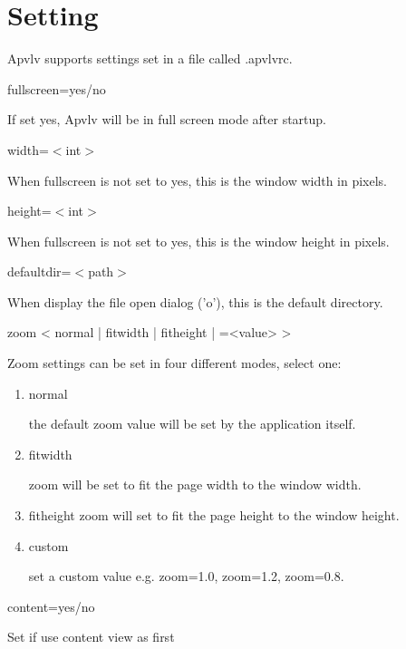 \documentclass[a4paper,12pt]{article}
\newcommand{\apvlv}{\textsf{Apvlv{ }}}
\begin{document}
\newpage

\section{Setting}\label{setting}

\apvlv supports settings set in a file called .apvlvrc.

\begin{description}

\item fullscreen=yes/no

If set yes, \apvlv will be in full screen mode after startup.

\item width=$<$int$>$

When fullscreen is not set to yes, this is the window width in pixels.

\item height=$<$int$>$

When fullscreen is not set to yes, this is the window height in pixels.

\item defaultdir=$<$path$>$

When display the file open dialog ('o'), this is the default directory.

\item zoom < normal | fitwidth | fitheight | =<value> >

Zoom settings can be set in four different modes, select one:
\begin{enumerate}

\item normal

the default zoom value will be set by the application itself.

\item fitwidth

zoom will be set to fit the page width to the window width.

\item fitheight
zoom will set to fit the page height to the window height.

\item custom

set a custom value e.g. zoom=1.0, zoom=1.2, zoom=0.8.

\end{enumerate}

\item content=yes/no

Set if use content view as first


\end{description}
\end{document}
